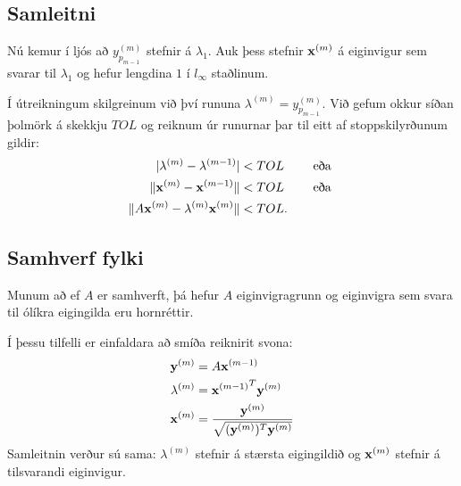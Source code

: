 \documentclass[letterpaper,10pt,icelandic]{sphinxmanual}
\begin{document}
\subsection{Samleitni}
\label{kafli09:samleitni}
Nú kemur í ljós að \(y_{p_{m-1}}^{(m)}\) stefnir á
\(\lambda_1\). Auk þess stefnir \({\mbox{${\bf x}$}}^{(m)}\) á
eiginvigur sem svarar til \(\lambda_1\) og hefur lengdina \(1\)
í \(l_\infty\) staðlinum.

Í útreikningum skilgreinum við því rununa
\(\lambda^{(m)}=y_{p_{m-1}}^{(m)}\). Við gefum okkur síðan þolmörk á
skekkju \(TOL\) og reiknum úr runurnar þar til eitt af
stoppskilyrðunum gildir:
\begin{gather}
\begin{split}\begin{aligned}
|\lambda^{(m)}-\lambda^{(m-1)}|&<TOL \qquad \text{ eða } \\
\|{\mbox{${\bf x}$}}^{(m)}-{\mbox{${\bf x}$}}^{(m-1)}\|&<TOL \qquad \text { eða } \\
\|A{\mbox{${\bf x}$}}^{(m)}-\lambda^{(m)}{\mbox{${\bf x}$}}^{(m)}\|&<TOL.\end{aligned}\end{split}\notag
\end{gather}

\subsection{Samhverf fylki}
\label{kafli09:index-5}\label{kafli09:samhverf-fylki}
Munum að ef \(A\) er samhverft, þá hefur \(A\) eiginvigragrunn
og eiginvigra sem svara til ólíkra eigingilda eru hornréttir.

Í þessu tilfelli er einfaldara að smíða reiknirit svona:
\begin{gather}
\begin{split}\begin{aligned}
  {\mbox{${\bf y}$}}^{(m)}&=A{\mbox{${\bf x}$}}^{(m-1)}\\
\lambda^{(m)}&={{\mbox{${\bf x}$}}^{(m-1)}}^T{\mbox{${\bf y}$}}^{(m)}\\
{\mbox{${\bf x}$}}^{(m)}&= \frac{{\mbox{${\bf y}$}}^{(m)}}{\sqrt{({\mbox{${\bf y}$}}^{(m)})^T{\mbox{${\bf y}$}}^{(m)}}}\end{aligned}\end{split}\notag
\end{gather}
Samleitnin verður sú sama: \(\lambda^{(m)}\) stefnir á stærsta
eigingildið og \({\mbox{${\bf x}$}}^{(m)}\) stefnir á tilsvarandi
eiginvigur.
\end{document}
